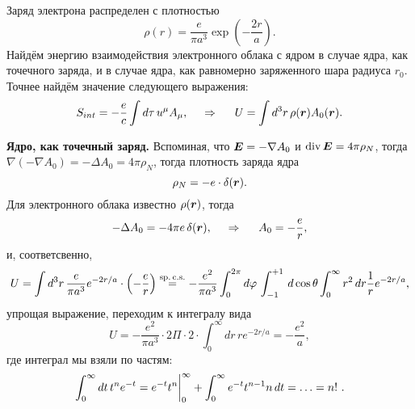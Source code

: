 
Заряд электрона распределен с плотностью
\begin{equation*}
    \rho(r) = \frac{e}{\pi a^3} \exp\left(-\frac{2r}{a}\right).
\end{equation*}
Найдём энергию взаимодействия электронного облака с ядром в случае ядра, как точечного заряда, и в случае ядра, как равномерно заряженного шара  радиуса $r_0$. Точнее найдём значение следующего выражения:
\begin{equation*}
    S_{int} = - \frac{e}{c} \int d \tau\, u^\mu A_\mu,
    \hspace{0.5cm} \Rightarrow \hspace{0.5cm}
    U = \int d^3 r\, \rho(\mbox{\boldmath $r$}) A_0 (\mbox{\boldmath $r$}).
\end{equation*}


\textbf{Ядро, как точечный заряд.} Вспоминая, что $\mbox{\boldmath $E$} = - \nabla A_0$ и $\mathop{\mathrm{div}}\nolimits \mbox{\boldmath $E$} = 4 \pi \rho_N$, тогда $\nabla(-\nabla A_0) = - \Delta A_0 = 4 \pi \rho_N$, тогда плотность заряда ядра
\begin{equation*}
    \rho_N = -e \cdot \delta(\mbox{\boldmath $r$}).
\end{equation*}
Для электронного облака известно $\rho(\mbox{\boldmath $r$})$, тогда
\begin{equation*}
    - \Delta A_0 = - 4 \pi e \, \delta(\mbox{\boldmath $r$}),
    \hspace{0.5cm} \Rightarrow \hspace{0.5cm}
    A_0 = - \frac{e}{r}, 
\end{equation*}
и, соответсвенно,
\begin{equation*}
    U = \int d^3 r\, 
    \frac{e}{\pi a^3} e^{-2r/a} \cdot \left(-\frac{e}{r}\right) \overset{\mathrm{sp.\, c.s.}}{=}
    - \frac{e^2}{\pi a^3} \int_{0}^{2\pi} d \varphi\, \int_{-1}^{+1} \, d \cos \theta \int_{0}^{\infty} r^2 \, d r \frac{1}{r} e^{-2r/a},
\end{equation*}
упрощая выражение, переходим к интегралу вида
\begin{equation*}
    U = - \frac{e^2}{\pi a^3} \cdot 2 \Pi \cdot 2  \cdot \int_{0}^{\infty}dr\, r e^{-2r/a}
    = - \frac{e^2}{a}
    ,
\end{equation*}
где интеграл мы взяли по частям:
\begin{equation*}
    \int_{0}^{\infty} dt\, t^n e^{-t} = e^{-t} t^n \bigg|_{0}^{\infty} + \int_{0}^{\infty} e^{-t} t^{n-1} n \, d t = \ldots = n!\ .
\end{equation*}

